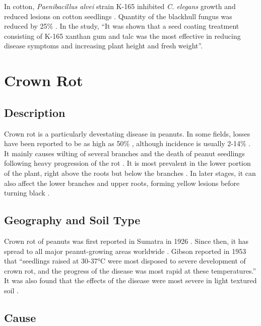 \documentclass[letterpaper, 12pt]{report}
\begin{document}
In cotton, \emph{Paenibacillus alvei} strain K-165 inhibited \emph{C. elegans} growth and reduced lesions on cotton seedlings \autocite{schoina2011evaluation}. Quantity of the blackhull fungus was reduced by 25\% \autocite{schoina2011evaluation}. In the study, ``It was shown that a seed coating treatment consisting of K-165 xanthan gum and talc was the most effective in reducing disease symptoms and increasing plant height and fresh weight''.

\section{Crown Rot}

\subsection{Description}

Crown rot is a particularly devestating disease in peanuts. In some fields, losses have been reported to be as high as 50\% \autocite{melouk1997aspergillus}, although incidence is usually 2-14\% \autocite{kishore2001biological}. It mainly causes wilting of several branches and the death of peanut seedlings following heavy progression of the rot \autocite{suzui1980occurrence}. It is most prevalent in the lower portion of the plant, right above the roots but below the branches \autocite{suzui1980occurrence}. In later stages, it can also affect the lower branches and upper roots, forming yellow lesions before turning black \autocite{suzui1980occurrence}.

\subsection{Geography and Soil Type}

Crown rot of peanuts was first reported in Sumatra in 1926 \autocite{anderson1926check}. Since then, it has spread to all major peanut-growing areas worldwide \autocite{melouk1997aspergillus}. Gibson reported in 1953 that ``seedlings raised at 30-37°C were most disposed to severe development of crown rot, and the progress of the disease was most rapid at these temperatures.'' It was also found that the effects of the disease were most severe in light textured soil \autocite{gibson1953crown}.

\subsection{Cause}
\end{document}
